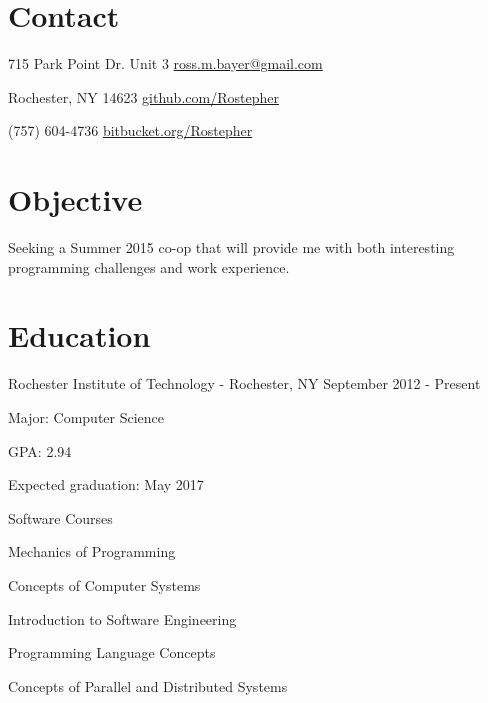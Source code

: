\documentclass[letterpaper,margin,line,11pt]{resume}
\newcommand{\rdate}[1]{\hfill {\small #1}}
\begin{document}
\begin{resume}

\section{\mysidestyle Contact}
	\begin{asparablank}
		\item 715 Park Point Dr. Unit 3 \hfill \href{mailto:ross.m.bayer@gmail.com}{ross.m.bayer@gmail.com}
		\item Rochester, NY 14623 \hfill \href{https://github.com/Rostepher}{github.com/Rostepher}
		\item (757) 604-4736 \hfill \href{https://bitbucket.org/Rostepher}{bitbucket.org/Rostepher}
	\end{asparablank}

\section{\mysidestyle Objective}
	Seeking a Summer 2015 co-op that will provide me with both interesting programming challenges and work experience.

\section{\mysidestyle Education}
	\begin{compactdesc}
        \item[Rochester Institute of Technology] - Rochester, NY \rdate{September 2012 - Present}
		\begin{compactitem} {
			\item Major: Computer Science
			\item GPA: 2.94
			\item Expected graduation: May 2017
			\item Software Courses
			\begin{compactitem} { \small
			    \item Mechanics of Programming
			    \item Concepts of Computer Systems
			    \item Introduction to Software Engineering
                \item Programming Language Concepts
                \item Concepts of Parallel and Distributed Systems
			} \end{compactitem}
		} \end{compactitem}
	\end{compactdesc}


\end{resume}
\end{document}
